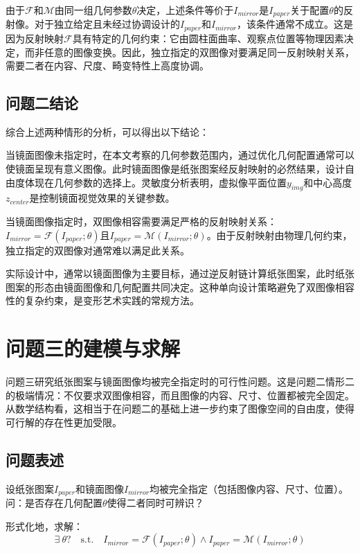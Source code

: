 \documentclass[withoutpreface]{cumcmthesis}
\begin{document}
由于$\mathcal{F}$和$\mathcal{M}$由同一组几何参数$\theta$决定，上述条件等价于$I_{mirror}$是$I_{paper}$关于配置$\theta$的反射像。对于独立给定且未经过协调设计的$I_{paper}$和$I_{mirror}$，该条件通常不成立。这是因为反射映射$\mathcal{F}$具有特定的几何约束：它由圆柱面曲率、观察点位置等物理因素决定，而非任意的图像变换。因此，独立指定的双图像对要满足同一反射映射关系，需要二者在内容、尺度、畸变特性上高度协调。

\subsection{问题二结论}

综合上述两种情形的分析，可以得出以下结论：

当镜面图像未指定时，在本文考察的几何参数范围内，通过优化几何配置通常可以使镜面呈现有意义图像。此时镜面图像是纸张图案经反射映射的必然结果，设计自由度体现在几何参数的选择上。灵敏度分析表明，虚拟像平面位置$y_{img}$和中心高度$z_{center}$是控制镜面视觉效果的关键参数。

当镜面图像指定时，双图像相容需要满足严格的反射映射关系：$I_{mirror}=\mathcal{F}(I_{paper};\theta)$且$I_{paper}=\mathcal{M}(I_{mirror};\theta)$。由于反射映射由物理几何约束，独立指定的双图像对通常难以满足此关系。

实际设计中，通常以镜面图像为主要目标，通过逆反射链计算纸张图案，此时纸张图案的形态由镜面图像和几何配置共同决定。这种单向设计策略避免了双图像相容性的复杂约束，是变形艺术实践的常规方法。

\section{问题三的建模与求解}

问题三研究纸张图案与镜面图像均被完全指定时的可行性问题。这是问题二情形二的极端情况：不仅要求双图像相容，而且图像的内容、尺寸、位置都被完全固定。从数学结构看，这相当于在问题二的基础上进一步约束了图像空间的自由度，使得可行解的存在性更加受限。

\subsection{问题表述}

设纸张图案$I_{paper}$和镜面图像$I_{mirror}$均被完全指定（包括图像内容、尺寸、位置）。问：是否存在几何配置$\theta$使得二者同时可辨识？

形式化地，求解：
\begin{equation}
\exists\ \theta? \quad \text{s.t.} \quad I_{mirror} = \mathcal{F}(I_{paper}; \theta) \land I_{paper} = \mathcal{M}(I_{mirror}; \theta)
\end{equation}
\end{document}
